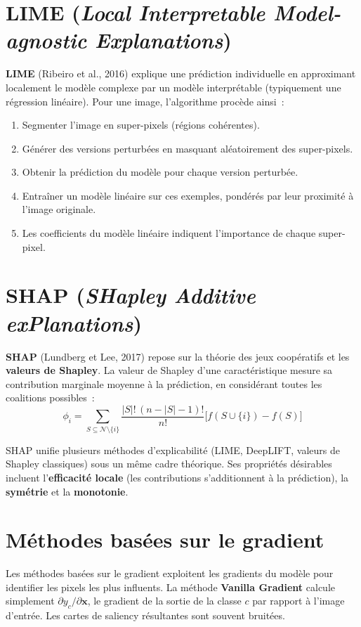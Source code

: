 \documentclass[a4paper,11pt,twoside]{book}
\newcommand{\vect}[1]{\boldsymbol{#1}}
\begin{document}
\section{LIME (\textit{Local Interpretable Model-agnostic Explanations})}

\textbf{LIME} (Ribeiro et al., 2016) explique une prédiction individuelle en approximant localement le modèle complexe par un modèle interprétable (typiquement une régression linéaire). Pour une image, l'algorithme procède ainsi~:

\begin{enumerate}[leftmargin=2em]
  \item Segmenter l'image en super-pixels (régions cohérentes).
  \item Générer des versions perturbées en masquant aléatoirement des super-pixels.
  \item Obtenir la prédiction du modèle pour chaque version perturbée.
  \item Entraîner un modèle linéaire sur ces exemples, pondérés par leur proximité à l'image originale.
  \item Les coefficients du modèle linéaire indiquent l'importance de chaque super-pixel.
\end{enumerate}

\section{SHAP (\textit{SHapley Additive exPlanations})}

\textbf{SHAP} (Lundberg et Lee, 2017) repose sur la théorie des jeux coopératifs et les \textbf{valeurs de Shapley}. La valeur de Shapley d'une caractéristique mesure sa contribution marginale moyenne à la prédiction, en considérant toutes les coalitions possibles~:
\[
\phi_i = \sum_{S \subseteq \mathcal{N} \setminus \{i\}} \frac{|S|!\,(n - |S| - 1)!}{n!} \Big[f(S \cup \{i\}) - f(S)\Big]
\]

SHAP unifie plusieurs méthodes d'explicabilité (LIME, DeepLIFT, valeurs de Shapley classiques) sous un même cadre théorique. Ses propriétés désirables incluent l'\textbf{efficacité locale} (les contributions s'additionnent à la prédiction), la \textbf{symétrie} et la \textbf{monotonie}.

\section{Méthodes basées sur le gradient}

Les méthodes basées sur le gradient exploitent les gradients du modèle pour identifier les pixels les plus influents. La méthode \textbf{Vanilla Gradient} calcule simplement $\partial y_c / \partial \vect{x}$, le gradient de la sortie de la classe $c$ par rapport à l'image d'entrée. Les cartes de saliency résultantes sont souvent bruitées.
\end{document}
